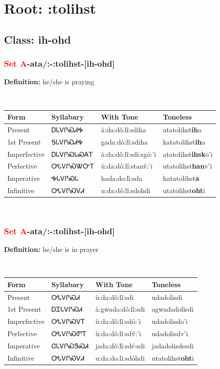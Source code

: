 \needspace{4in}
\section*{Root: :tolihst}
\nopagebreak
{}
\needspace{3in}
\subsection*{Class: ih-ohd}
\nopagebreak
\needspace{2in}
\subsubsection*{\textcolor{Red}{Set A}{-}ata/:{-}\textbf{:tolihst}{-}[ih-ohd]}
\nopagebreak
\textbf{Definition: } he/she is praying
\\[0.5em]
\begin{tabularx}{\textwidth}{l X X X}%
\toprule%
\textbf{Form}&\textbf{Syllabary}&\textbf{With Tone}&\textbf{Toneless}\\%
\midrule%
Present&ᎠᏓᏙᎵᏍᏗᎭ&à:da:dǒ:lî:sdiha&atatolihst\textbf{ih}a\\%
1st Present&ᎦᏓᏙᎵᏍᏗᎭ&gada:dǒ:lî:sdiha&katatolihst\textbf{ih}a\\%
Imperfective&ᎠᏓᏙᎵᏍᏓᏍᎪᎢ&à:da:dǒ:lî:sdi:sgó:’i&atatolihst\textbf{ihsk}o'i\\%
Perfective&ᎤᏓᏙᎵᏍᏔᏅᎢ&ù:da:dǒ:lî:stanv̌:’i&utatolihst\textbf{han}v'i\\%
Imperative&ᎭᏓᏙᎵᏍᏓ&hada:do:lì:sda&hatatolihst\textbf{a}\\%
Infinitive&ᎤᏓᏙᎵᏍᏙᏗ&u:da:dǒ:lî:sdohdi&utatolihst\textbf{oht}i\\%
\bottomrule%
\end{tabularx}
\\[1em]
\needspace{2in}
\subsubsection*{\textcolor{Red}{Set A}{-}ata/:{-}\textbf{:tolihst}{-}[ih-ohd]}
\nopagebreak
\textbf{Definition: } he/she is in prayer
\\[0.5em]
\begin{tabularx}{\textwidth}{l X X X}%
\toprule%
\textbf{Form}&\textbf{Syllabary}&\textbf{With Tone}&\textbf{Toneless}\\%
\midrule%
Present&ᎤᏓᏙᎵᏍᏗ&ù:da:dǒ:lî:sdi&udadolisdi\\%
1st Present&ᎠᏆᏓᏙᎵᏍᏗ&à:gwada:dǒ:lî:sdi&agwadadolisdi\\%
Imperfective&ᎤᏓᏙᎵᏍᏙᎢ&ù:da:dǒ:lî:sdó:’i&udadolisdo{\textquoteright}i\\%
Perfective&ᎤᏓᏙᎵᏍᏛᎢ&ù:da:dǒ:lî:sdv̌:’i&udadolisdv{\textquoteright}i\\%
Imperative&ᏣᏓᏙᎵᏍᏕᏍᏗ&jada:dǒ:lî:sdé:sdi&jadadolisdesdi\\%
Infinitive&ᎤᏓᏙᎵᏍᏙᏗ&u:da:do:lì:sdóhdi&utatolihst\textbf{oht}i\\%
\bottomrule%
\end{tabularx}
\\[1em]